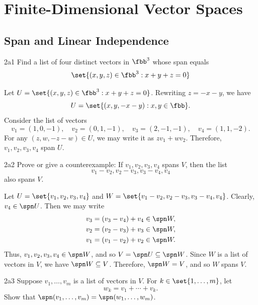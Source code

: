 \section{Finite-Dimensional Vector Spaces}

\subsection{Span and Linear Independence}

\begin{exercise}{2a1}
    Find a list of four distinct vectors in $\fbb^3$ whose span equals
    \[
    	\set{(x, y, z) \in \fbb^3 : x + y + z = 0}
    \]
\end{exercise}

\begin{sol}
    Let $U = \set{(x, y, z) \in \fbb^3 : x + y + z = 0}$.
    Rewriting $z = -x - y$, we have
    \[
        U = \set{(x, y, -x - y) : x, y \in \fbb}.
    \]
    Consider the list of vectors
    \[
        v_1 = (1, 0, -1), \quad v_2 = (0, 1, -1), \quad v_3 = (2, -1, -1), \quad v_4 = (1, 1, -2).
    \]
    For any $(z, w, -z - w) \in U$, we may write it as $z v_1 + w v_2$.
    Therefore, $v_1, v_2, v_3, v_4$ span $U$.
\end{sol}

\begin{exercise}{2a2}
    Prove or give a counterexample: If $v_1, v_2, v_3, v_4$ spans $V$, then the list
    \[
    	v_1 - v_2, v_2 - v_3, v_3 - v_4, v_4
    \]
    also spans $V$.
\end{exercise}

\begin{sol}
    Let $U = \set{v_1, v_2, v_3, v_4}$ and $W = \set{v_1 - v_2, v_2 - v_3, v_3 - v_4, v_4}$.
	Clearly, $v_4 \in \spn U$.
	Then we may write
    \begin{align*}
        v_3 &= (v_3 - v_4) + v_4 \in \spn W, \\
        v_2 &= (v_2 - v_3) + v_3 \in \spn W, \\
        v_1 &= (v_1 - v_2) + v_2 \in \spn W.
    \end{align*}
    Thus, $v_1, v_2, v_3, v_4 \in \spn W$, and so $V = \spn U \subseteq \spn W$.
	Since $W$ is a list of vectors in $V$, we have $\spn W \subseteq V$.
	Therefore, $\spn W = V$, and so $W$ spans $V$.
\end{sol}
 
\begin{exercise}{2a3}
    Suppose $v_1, \ldots, v_m$ is a list of vectors in $V$.
	For $k \in \set{1, \ldots, m}$, let
    \[
    	w_k = v_1 + \cdots + v_k.
    \]
    Show that $\spn(v_1, \ldots, v_m) = \spn(w_1, \ldots, w_m)$.
\end{exercise}

